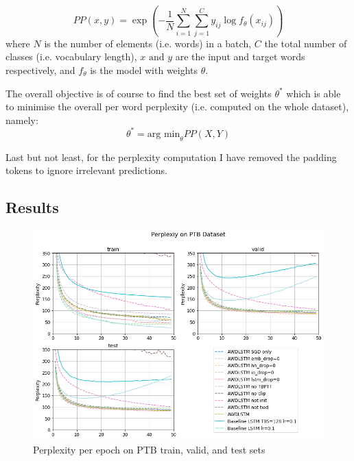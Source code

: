 \begin{equation}
    PP(x, y) = \exp{\left(-\frac{1}{N} \sum^{N}_{i=1}{\sum^{C}_{j=1}{y_{ij} \log{f_{\theta}(x_{ij})}}}\right)}
\end{equation}
where $N$ is the number of elements (i.e. words) in a batch, $C$ the total number of classes (i.e. vocabulary length), $x \text{ and } y$ are the input and target words respectively, and $f_{\theta}$ is the model with weights $\theta$.

The overall objective is of course to find the best set of weights $\theta^*$ which is able to minimise the overall per word perplexity (i.e. computed on the whole dataset), namely:
\begin{equation}
    \theta^* = \text{arg min}_{\theta} PP(X, Y)
\end{equation}

Last but not least, for the perplexity computation I have removed the padding tokens to ignore irrelevant predictions.

\subsection{Results}

\begin{figure}
    \centering
    \includegraphics[scale=0.28]{assets/run_results.png}
    \vspace{-1.0em}
    \caption{Perplexity per epoch on PTB train, valid, and test sets}
    \vspace{-1.0em}
    \label{fig:results}
\end{figure}

